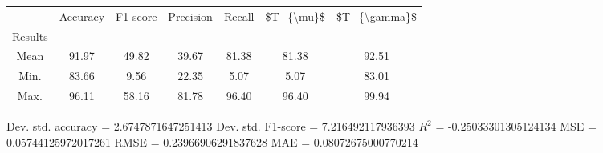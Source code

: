 \begin{tabular}{|c|c|c|c|c|c|c|}
\toprule
{} &  Accuracy &  F1 score &  Precision &  Recall &  \$T\_\{\textbackslash mu\}\$ &  \$T\_\{\textbackslash gamma\}\$ \\
Results &           &           &            &         &            &               \\
\hline
Mean    &     91.97 &     49.82 &      39.67 &   81.38 &      81.38 &         92.51 \\
Min.    &     83.66 &      9.56 &      22.35 &    5.07 &       5.07 &         83.01 \\
Max.    &     96.11 &     58.16 &      81.78 &   96.40 &      96.40 &         99.94 \\
\bottomrule
\end{tabular}

 Dev. std. accuracy = 2.6747871647251413
 Dev. std. F1-score = 7.216492117936393
 $R^2$ = -0.25033301305124134
 MSE = 0.05744125972017261
 RMSE = 0.23966906291837628
 MAE = 0.08072675000770214